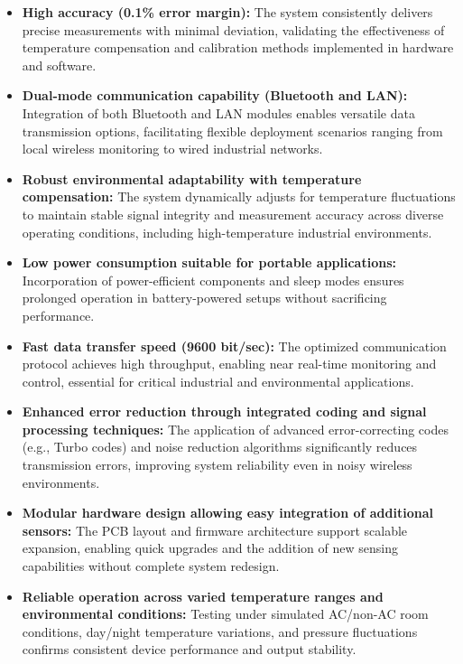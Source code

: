 \documentclass[12pt]{report}
\begin{document}
\begin{itemize}[leftmargin=*]
    \item \textbf{High accuracy (0.1\% error margin):} The system consistently delivers precise measurements with minimal deviation, validating the effectiveness of temperature compensation and calibration methods implemented in hardware and software.
    
    \item \textbf{Dual-mode communication capability (Bluetooth and LAN):} Integration of both Bluetooth and LAN modules enables versatile data transmission options, facilitating flexible deployment scenarios ranging from local wireless monitoring to wired industrial networks.
    
    \item \textbf{Robust environmental adaptability with temperature compensation:} The system dynamically adjusts for temperature fluctuations to maintain stable signal integrity and measurement accuracy across diverse operating conditions, including high-temperature industrial environments.
    
    \item \textbf{Low power consumption suitable for portable applications:} Incorporation of power-efficient components and sleep modes ensures prolonged operation in battery-powered setups without sacrificing performance.
    
    \item \textbf{Fast data transfer speed (9600 bit/sec):} The optimized communication protocol achieves high throughput, enabling near real-time monitoring and control, essential for critical industrial and environmental applications.
    
    \item \textbf{Enhanced error reduction through integrated coding and signal processing techniques:} The application of advanced error-correcting codes (e.g., Turbo codes) and noise reduction algorithms significantly reduces transmission errors, improving system reliability even in noisy wireless environments.
    
    \item \textbf{Modular hardware design allowing easy integration of additional sensors:} The PCB layout and firmware architecture support scalable expansion, enabling quick upgrades and the addition of new sensing capabilities without complete system redesign.
    
    \item \textbf{Reliable operation across varied temperature ranges and environmental conditions:} Testing under simulated AC/non-AC room conditions, day/night temperature variations, and pressure fluctuations confirms consistent device performance and output stability.
    

\end{itemize}
\end{document}
